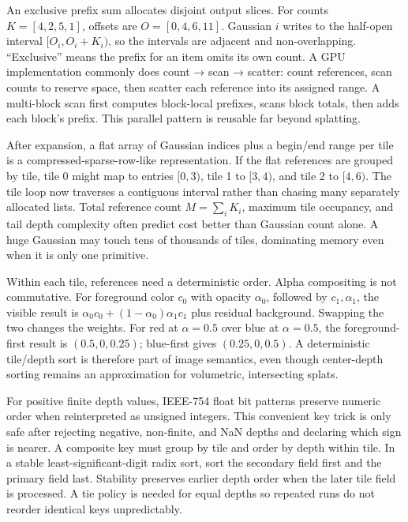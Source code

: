 An exclusive prefix sum allocates disjoint output slices. For counts \(K=[4,2,5,1]\), offsets are \(O=[0,4,6,11]\). Gaussian \(i\) writes to the half-open interval \([O_i,O_i+K_i)\), so the intervals are adjacent and non-overlapping. ``Exclusive'' means the prefix for an item omits its own count. A GPU implementation commonly does count → scan → scatter: count references, scan counts to reserve space, then scatter each reference into its assigned range. A multi-block scan first computes block-local prefixes, scans block totals, then adds each block's prefix. This parallel pattern is reusable far beyond splatting.

After expansion, a flat array of Gaussian indices plus a begin/end range per tile is a compressed-sparse-row-like representation. If the flat references are grouped by tile, tile 0 might map to entries \([0,3)\), tile 1 to \([3,4)\), and tile 2 to \([4,6)\). The tile loop now traverses a contiguous interval rather than chasing many separately allocated lists. Total reference count \(M=\sum_iK_i\), maximum tile occupancy, and tail depth complexity often predict cost better than Gaussian count alone. A huge Gaussian may touch tens of thousands of tiles, dominating memory even when it is only one primitive.

Within each tile, references need a deterministic order. Alpha compositing is not commutative. For foreground color \(c_0\) with opacity \(\alpha_0\), followed by \(c_1,\alpha_1\), the visible result is \(\alpha_0c_0+(1-\alpha_0)\alpha_1c_1\) plus residual background. Swapping the two changes the weights. For red at \(\alpha=0.5\) over blue at \(\alpha=0.5\), the foreground-first result is \((0.5,0,0.25)\); blue-first gives \((0.25,0,0.5)\). A deterministic tile/depth sort is therefore part of image semantics, even though center-depth sorting remains an approximation for volumetric, intersecting splats.

For positive finite depth values, IEEE-754 float bit patterns preserve numeric order when reinterpreted as unsigned integers. This convenient key trick is only safe after rejecting negative, non-finite, and NaN depths and declaring which sign is nearer. A composite key must group by tile and order by depth within tile. In a stable least-significant-digit radix sort, sort the secondary field first and the primary field last. Stability preserves earlier depth order when the later tile field is processed. A tie policy is needed for equal depths so repeated runs do not reorder identical keys unpredictably.

